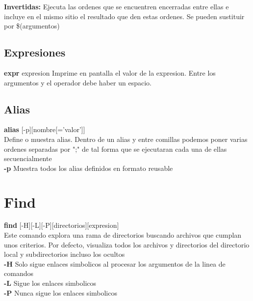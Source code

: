 \documentclass[11pt]{article}
\begin{document}
\textbf{Invertidas:} Ejecuta las ordenes que se encuentren encerradas entre ellas e incluye en el mismo sitio el resultado que den estas ordenes. Se pueden sustituir por \$(argumentos)\\

\subsection{Expresiones}
\textbf{expr} expresion \hspace{2cm} Imprime en pantalla el valor de la expresion. Entre los argumentos y el operador debe haber un espacio.\\

\subsection{Alias}
\textbf{alias} [-p][nombre[='valor']]\\
Define o muestra alias. Dentro de un alias y entre comillas podemos poner varias ordenes separadas por ";" de tal forma que se ejecutaran cada una de ellas secuencialmente\\
\hspace{2cm} \textbf{-p} \hspace{2cm} Muestra todos los alias definidos en formato reusable\\

\section{Find}

\textbf{find} [-H][-L][-P][directorios][expresion]\\
Este comando explora una rama de directorios buscando archivos que cumplan unos criterios. Por defecto, visualiza todos los archivos y directorios del directorio local y subdirectorios incluso los ocultos\\

\hspace{2cm} \textbf{-H}\hspace{2cm} Solo sigue enlaces simbolicos al procesar los argumentos de la linea de comandos\\

\hspace{2cm} \textbf{-L}\hspace{2cm} Sigue los enlaces simbolicos\\

\hspace{2cm} \textbf{-P}\hspace{2cm} Nunca sigue los enlaces simbolicos\\
\end{document}
